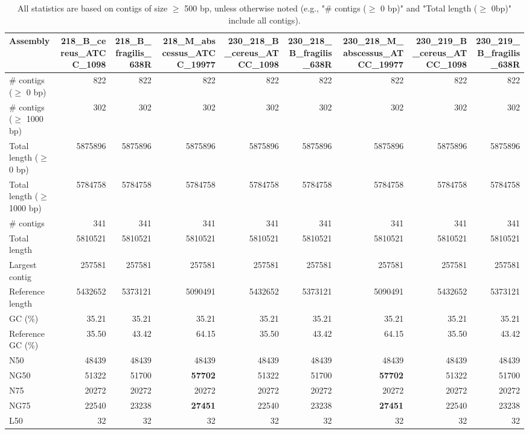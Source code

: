 \documentclass[12pt,a4paper]{article}
\begin{document}
\begin{table}[ht]
\begin{center}
\caption{All statistics are based on contigs of size $\geq$ 500 bp, unless otherwise noted (e.g., "\# contigs ($\geq$ 0 bp)" and "Total length ($\geq$ 0bp)" include all contigs).}
\begin{tabular}{|l*{8}{|r}|}
\hline
Assembly & 218\_B\_cereus\_ATCC\_1098 & 218\_B\_fragilis\_638R & 218\_M\_abscessus\_ATCC\_19977 & 230\_218\_B\_cereus\_ATCC\_1098 & 230\_218\_B\_fragilis\_638R & 230\_218\_M\_abscessus\_ATCC\_19977 & 230\_219\_B\_cereus\_ATCC\_1098 & 230\_219\_B\_fragilis\_638R \\ \hline
\# contigs ($\geq$ 0 bp) & 822 & 822 & 822 & 822 & 822 & 822 & 822 & 822 \\ \hline
\# contigs ($\geq$ 1000 bp) & 302 & 302 & 302 & 302 & 302 & 302 & 302 & 302 \\ \hline
Total length ($\geq$ 0 bp) & 5875896 & 5875896 & 5875896 & 5875896 & 5875896 & 5875896 & 5875896 & 5875896 \\ \hline
Total length ($\geq$ 1000 bp) & 5784758 & 5784758 & 5784758 & 5784758 & 5784758 & 5784758 & 5784758 & 5784758 \\ \hline
\# contigs & 341 & 341 & 341 & 341 & 341 & 341 & 341 & 341 \\ \hline
Total length & 5810521 & 5810521 & 5810521 & 5810521 & 5810521 & 5810521 & 5810521 & 5810521 \\ \hline
Largest contig & 257581 & 257581 & 257581 & 257581 & 257581 & 257581 & 257581 & 257581 \\ \hline
Reference length & 5432652 & 5373121 & 5090491 & 5432652 & 5373121 & 5090491 & 5432652 & 5373121 \\ \hline
GC (\%) & 35.21 & 35.21 & 35.21 & 35.21 & 35.21 & 35.21 & 35.21 & 35.21 \\ \hline
Reference GC (\%) & 35.50 & 43.42 & 64.15 & 35.50 & 43.42 & 64.15 & 35.50 & 43.42 \\ \hline
N50 & 48439 & 48439 & 48439 & 48439 & 48439 & 48439 & 48439 & 48439 \\ \hline
NG50 & 51322 & 51700 & {\bf 57702} & 51322 & 51700 & {\bf 57702} & 51322 & 51700 \\ \hline
N75 & 20272 & 20272 & 20272 & 20272 & 20272 & 20272 & 20272 & 20272 \\ \hline
NG75 & 22540 & 23238 & {\bf 27451} & 22540 & 23238 & {\bf 27451} & 22540 & 23238 \\ \hline
L50 & 32 & 32 & 32 & 32 & 32 & 32 & 32 & 32 \\ \hline

\end{tabular}
\end{center}
\end{table}
\end{document}
